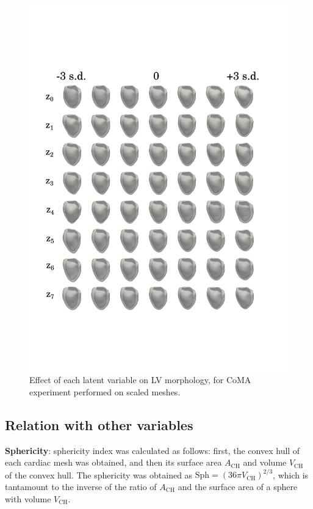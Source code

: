 \begin{figure}
\includegraphics[width=\textwidth]{figs/supplementary/experiment_1_synthetic_meshes}
\caption{Effect of each latent variable on LV morphology, for CoMA experiment performed on scaled meshes.}
\label{fig:experiment_1_synthetic_meshes}
\end{figure}


\subsection*{Relation with other variables}
\textbf{Sphericity}: sphericity index was calculated as follows: first, the convex hull of each cardiac mesh was obtained, and then its surface area $A_{\text{CH}}$ and volume $V_{\text{CH}}$ of the convex hull. The sphericity was obtained as $\text{Sph}=(36\pi V_{\text{CH}})^{2/3}$, which is tantamount to the inverse of the ratio of $A_{\text{CH}}$ and the surface area of a sphere with volume $V_{\text{CH}}$.

